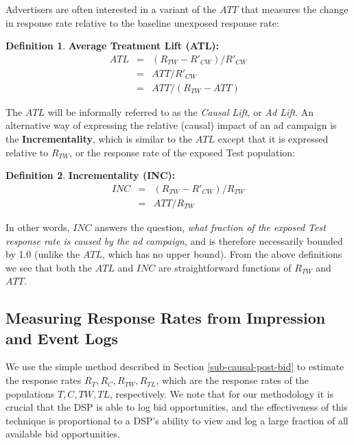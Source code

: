 \documentclass[11pt,a4paper]{article}
\theoremstyle{definition}
\newtheorem{definition}{Definition}[section]
\theoremstyle{remark}
\theoremstyle{definition}
\theoremstyle{definition}
\theoremstyle{definition}
\theoremstyle{definition}
\theoremstyle{definition}
\theoremstyle{definition}
\begin{document}
Advertisers are often interested in a variant of the $ATT$ that measures the change in response rate relative to the baseline unexposed response rate:

\begin{definition}\label{def-lift}\small
	\textbf{Average Treatment Lift (ATL):} 
\begin{eqnarray}
ATL &= & (R_{TW} - R'_{CW})/R'_{CW}\\
    &= & ATT/R'_{CW}\\
    &= & ATT/(R_{TW} - ATT) \label{eq-atl}	
\end{eqnarray}
\end{definition}

The $ATL$ will be informally referred to as the \textit{Causal Lift}, or \textit{Ad Lift}. An alternative way of expressing the relative (causal) impact of an ad campaign is the \textbf{Incrementality}, which is similar to the $ATL$ except that it is expressed relative to $R_{TW}$, or the response rate of the exposed Test population:

\begin{definition}\label{def-inc}\small
	\textbf{Incrementality (INC):} 
\begin{eqnarray}
INC &= & (R_{TW} - R'_{CW})/R_{TW}\\
    &= & ATT/R_{TW} 	\label{eq-inc}	
\end{eqnarray}
\end{definition}

In other words, $INC$ answers the question, \textit{what fraction of the exposed Test response rate is caused by the ad campaign}, and is therefore necessarily bounded by 1.0 (unlike the $ATL$, which has no upper bound). From the above definitions we see that both the $ATL$ and $INC$ are straightforward functions of $R_{TW}$ and $ATT$.


\subsection{Measuring Response Rates from Impression and Event Logs}
We use the simple method described in Section \ref{sub-causal-post-bid} to estimate the response rates   
$R_T, R_C, R_{TW}, R_{TL}$, which are the response rates of the populations $T,C,TW,TL$, respectively. 
We note that for our methodology it is crucial that the DSP is able to log bid opportunities, and the effectiveness of this technique is proportional to a DSP's ability to view and log a large fraction of all available bid opportunities.
 
\end{document}
